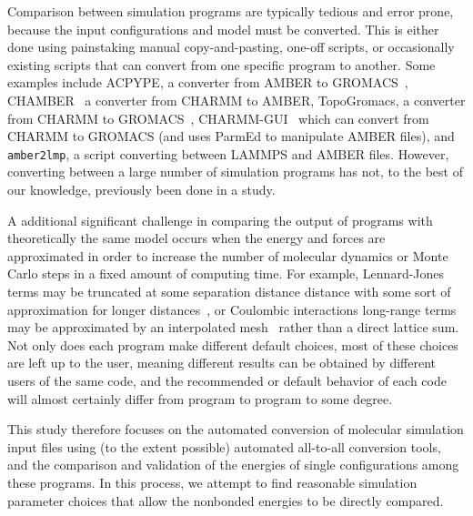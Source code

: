 Comparison between simulation programs are typically tedious and error
prone, because the input configurations and model must be converted.
This is either done using painstaking manual copy-and-pasting,
one-off scripts, or occasionally existing scripts that can convert
from one specific program to another.  Some examples include ACPYPE, a
converter from AMBER to GROMACS~\citep{sousa_da_silva_acpype_2012},
CHAMBER~\citep{crowley_chamber:_2009} a converter from CHARMM to
AMBER, TopoGromacs, a converter from CHARMM to
GROMACS~\citep{vermaas_topogromacs:_2016},
CHARMM-GUI~\citep{lee_charmm-gui_2016} which can convert from CHARMM
to GROMACS (and uses ParmEd to manipulate AMBER files), and {\tt
  amber2lmp}, a script converting between LAMMPS and AMBER
files. However, converting between a large number of simulation
programs has not, to the best of our knowledge, previously been done
in a study.


A additional significant challenge in comparing the output of programs
with theoretically the same model occurs when the energy and forces
are approximated in order to increase the number of molecular dynamics
or Monte Carlo steps in a fixed amount of computing time. For example,
Lennard-Jones terms may be truncated at some separation distance
distance with some sort of approximation for longer
distances~\citep{AllenAndTildesley,shirts_accurate_2007,wu_isotropic_2005},
or Coulombic interactions long-range terms may be approximated by an
interpolated mesh~\citep{essmann_smooth_1995} rather than a direct
lattice sum.  Not only does each program make different default
choices, most of these choices are left up to the user, meaning
different results can be obtained by different users of the same code,
and the recommended or default behavior of each code will almost
certainly differ from program to program to some degree.

This study therefore focuses on the automated conversion of molecular
simulation input files using (to the extent possible) automated
all-to-all conversion tools, and the comparison and validation of the
energies of single configurations among these programs. In this
process, we attempt to find reasonable simulation parameter choices
that allow the nonbonded energies to be directly compared.

